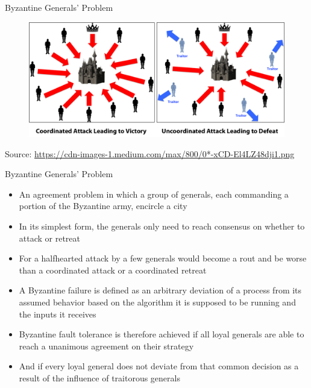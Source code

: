 \documentclass[9pt]{beamer}
\begin{document}

\begin{frame}{Byzantine Generals' Problem}
	\begin{figure}[]
		\centering
		\includegraphics  [width=4.in]{Images/byzantine}
	\end{figure}
	\begin{tiny}
		Source: \href{https://cdn-images-1.medium.com/max/800/0*-xCD-El4LZ48dji1.png}{https://cdn-images-1.medium.com/max/800/0*-xCD-El4LZ48dji1.png}
	\end{tiny}
\end{frame}



\begin{frame}{Byzantine Generals' Problem}
	\begin{itemize}
		\item An agreement problem in which a group of generals, each commanding a portion of the Byzantine army, encircle a city
		\item In its simplest form, the generals only need to reach consensus on whether to attack or retreat
		\item For a halfhearted attack by a few generals would become a rout and be worse than a coordinated attack or a coordinated retreat
		\item A Byzantine failure is defined as an arbitrary deviation of a process from its assumed behavior based on the algorithm it is supposed to be running and the inputs it receives
		\item Byzantine fault tolerance is therefore achieved if all loyal generals are able to reach a unanimous agreement on their strategy
		\item And if every loyal general does not deviate from that common decision as a result of the influence of traitorous generals
	\end{itemize}
\end{frame}
\end{document}
